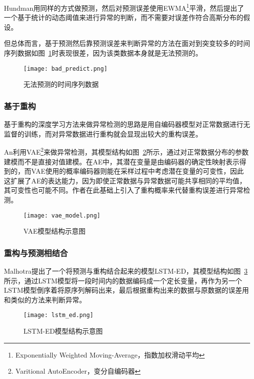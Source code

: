 Hundman\cite{DBLP:conf/kdd/HundmanCLCS18}用同样的方式做预测，然后对预测误差使用EWMA\footnote{Exponentially Weighted Moving-Average，指数加权滑动平均}平滑，然后提出了一个基于统计的动态阈值来进行异常的判断，而不需要对误差作符合高斯分布的假设。

但总体而言，基于预测然后靠预测误差来判断异常的方法在面对到突变较多的时间序列数据如图~\ref{fig:bad:predict}时表现很差，因为该类数据本身就是无法预测的。

\begin{figure}[htbp]
    \centering
    \texttt{[image: bad\_predict.png]}
    \caption{无法预测的时间序列数据\cite{malhotra2016lstm}}
    \label{fig:bad:predict}
  \end{figure}

\subsubsection{基于重构}

基于重构的深度学习方法来做异常检测的思路是用自编码器模型对正常数据进行无监督的训练，而对异常数据进行重构就会显现出较大的重构误差。

An\cite{an2015variational}利用VAE\footnote{Varitional AutoEncoder，变分自编码器}来做异常检测，其模型结构如图~\ref{fig:vae:model}所示，通过对正常数据分布的参数建模而不是直接对值建模。在AE中，其潜在变量是由编码器的确定性映射表示得到的，而VAE使用的概率编码器则能在采样过程中考虑潜在变量的可变性，因此这扩展了AE的表达能力，因为即使正常数据与异常数据可能共享相同的平均值，其可变性也可能不同。作者在此基础上引入了重构概率来代替重构误差进行异常检测。

\begin{figure}[htbp]
    \centering
    \texttt{[image: vae\_model.png]}
    \caption{VAE模型结构示意图\cite{an2015variational}}
    \label{fig:vae:model}
  \end{figure}

\subsubsection{重构与预测相结合}
Malhotra\cite{malhotra2016lstm}提出了一个将预测与重构结合起来的模型LSTM-ED，其模型结构如图~\ref{fig:lstm:ed}所示，通过LSTM模型将一段时间内的数据编码成一个定长变量，再作为另一个LSTM模型倒序着将原序列解码出来，最后根据重构出来的数据与原数据的误差用和\cite{malhotra2015long}类似的方法来判断异常。

\begin{figure}[htbp]
    \centering
    \texttt{[image: lstm\_ed.png]}
    \caption{LSTM-ED模型结构示意图\cite{malhotra2016lstm}}
    \label{fig:lstm:ed}
  \end{figure}


